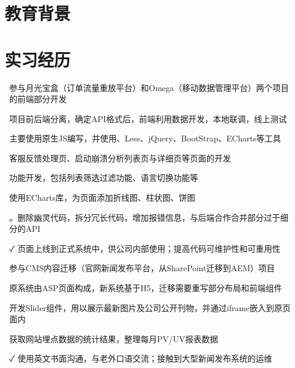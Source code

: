 \documentclass[14pt]{resume}
\begin{document}
\section{\faGraduationCap\  教育背景}

\section{\faBriefcase\ 实习经历}
\begin{itemize}
    \item[\faFlagO] 参与月光宝盒（订单流量重放平台）和Omega（移动数据管理平台）两个项目的前端部分开发
    \item[\faFlagO] 项目前后端分离，确定API格式后，前端利用\textbf{\color{red}{Mock}}数据开发，本地联调，线上测试
    \item[\faFlagO] 主要使用原生JS编写，并使用\textbf{\color{red}{模板引擎Simplite}}、Less、jQuery、BootStrap、ECharts等工具
    \item[\faCode] 客服反馈处理页、启动崩溃分析列表页与详细页等页面的开发
    \item[\faCode] 功能开发，包括列表筛选过滤功能、语言切换功能等
    \item[\faCode] 使用ECharts库，为页面添加折线图、柱状图、饼图
    \item[\faCode] \textbf{\color{red}{代码重构}}。删除幽灵代码，拆分冗长代码，增加报错信息，与后端合作合并部分过于细分的API
    \item[\faCheck] 页面上线到正式系统中，供公司内部使用；提高代码可维护性和可重用性
\end{itemize}


\begin{itemize}
    \item[\faFlagO] 参与CMS内容迁移（官网新闻发布平台，从SharePoint迁移到AEM）项目
    \item[\faFlagO] 原系统由ASP页面构成，新系统基于H5，迁移需要重写部分布局和前端组件
    \item[\faCode] 开发Slider组件，用以展示最新图片及公司公开刊物，并通过iframe嵌入到原页面内
    \item[\faCode] 获取网站埋点数据的统计结果，整理每月PV/UV报表数据
    \item[\faCheck] 使用英文书面沟通，与老外口语交流；接触到大型新闻发布系统的运维
\end{itemize}
\end{document}
